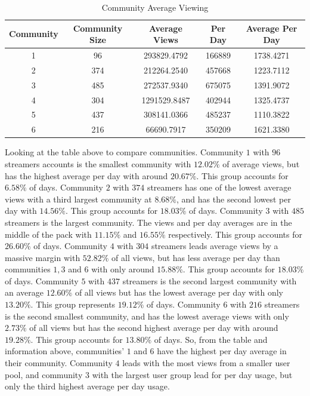 \documentclass[10pt]{article}
\begin{document}
\begin{table}[H]
\footnotesize
\centering
\begin{tabular}{|c|c|c|c|c|}
\hline
    \bf{Community} & \bf{Community Size} & \bf{Average Views}
     & \bf{Per Day} & \bf{Average Per Day} \\
\hline
    1 & 96 & 293829.4792 & 166889 & 1738.4271 \\
    2 & 374 & 212264.2540 & 457668 &  1223.7112 \\
    3 & 485 & 272537.9340 & 675075 & 1391.9072 \\
    4 & 304 & 1291529.8487 & 402944 & 1325.4737 \\
    5 & 437 & 308141.0366 & 485237 & 1110.3822 \\
    6 & 216 &  66690.7917 & 350209 & 1621.3380 \\
\hline
\end{tabular}
\caption{Community Average Viewing}
\label{tab:comm_att}
\end{table}

Looking at the table above to compare communities.
Community $1$ with $96$ streamers accounts is the smallest community with
$12.02\%$ of average views, but has the highest average per day with around
$20.67\%$. This group accounts for $6.58\%$ of days.
Community $2$ with $374$ streamers has one of the lowest average views with a
third largest community at $8.68\%$, and has the second lowest per day with
$14.56\%$. This group accounts for $18.03\%$ of days.
Community $3$ with $485$ streamers is the largest community. The views and per day
averages are in the middle of the pack with $11.15\%$ and $16.55\%$
respectively. This group accounts for $26.60\%$ of days.
Community $4$ with $304$ streamers leads average views by a massive margin with
$52.82\%$ of all views, but has less average per day than communities $1, 3$
and $6$ with only around $15.88\%$. This group accounts for $18.03\%$ of days.
Community $5$ with $437$ streamers is the second largest community with an average
$12.60\%$ of all views but has the lowest average per day with only
$13.20\%$. This group represents $19.12\%$ of days.
Community $6$ with $216$ streamers is the second smallest community, and has the
lowest average views with only $2.73\%$ of all views but has the second
highest average per day with around $19.28\%$. This group accounts for
$13.80\%$ of days.
So, from the table and information above, communities'
$1$ and $6$ have the highest per day average in their community. Community $4$
leads with the most views from a smaller user pool, and community $3$ with the
largest user group lead for per day usage, but only the third highest average
per day usage.
\end{document}
